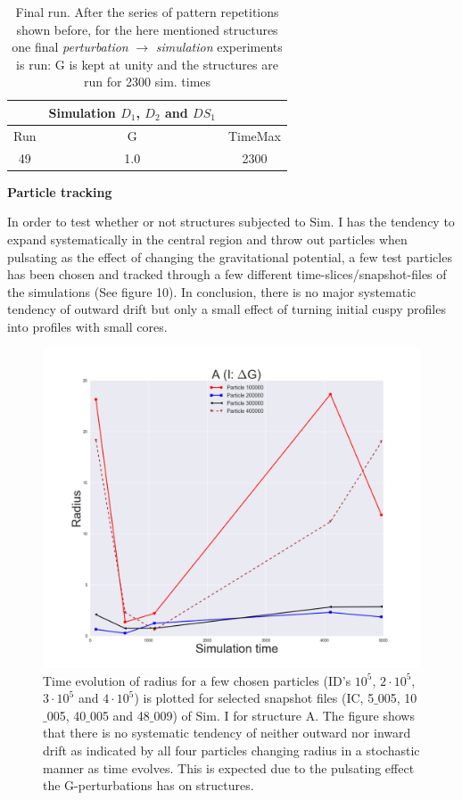 \begin{table}[!htbp]
\centering
\begin{tabular}{|c|c|c|}
\hline
            & Simulation $D_1$, $D_2$ and $DS_1$ &             \\ \hline
 Run        &     G                              &  TimeMax    \\ \hline
 49         &    1.0                             &    2300     \\ \hline   
\end{tabular}
\caption {Final run. After the series of pattern repetitions shown before, for the here mentioned structures one final \textit{perturbation} $\rightarrow$ \textit{simulation} experiments is run: G is kept at unity and the structures are run for 2300 sim. times}
\end{table}

\centerline{\textbf{Particle tracking}}
In order to test whether or not structures subjected to Sim. I has the tendency to expand systematically in the central region and throw out particles when pulsating as the effect of changing the gravitational potential, a few test particles has been chosen and tracked through a few different time-slices/snapshot-files of the simulations (See figure 10). In conclusion, there is no major systematic tendency of outward drift but only a small effect of turning initial cuspy profiles into profiles with small cores.

\begin{figure}[!htbp]
\centering
\includegraphics[width=1.0\linewidth]{img/Fig_combine_ASCII_A.png}
\caption{Time evolution of radius for a few chosen particles (ID's $10^5$, $2\cdot10^5$, $3\cdot10^5$ and $4\cdot10^5$) is plotted for selected snapshot files (IC, 5$\_$005, 10$\_$005, 40$\_$005 and 48$\_$009) of Sim. I for structure A. The figure shows that there is no systematic tendency of neither outward nor inward drift as indicated by all four particles changing radius in a stochastic manner as time evolves. This is expected due to the pulsating effect the G-perturbations has on structures.}
\label{fig:test}
\end{figure}

